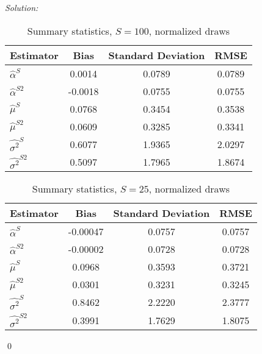 \documentclass[12pt]{article}
\newenvironment{sol}
    {\emph{Solution:}
    }
    {
    \qed
    }
\begin{document}
\begin{sol}
          \begin{table}[htbp]
            \centering
            \caption{Summary statistics, $S = 100$, normalized draws}
              \begin{tabular}{lccc}
                  \toprule
                    Estimator                & Bias             & Standard Deviation         & RMSE           \\
                  \midrule
                    $\hat{\alpha}^S $  &  0.0014&  0.0789   &    0.0789\\
                    $\hat{\alpha}^{S2}$   &-0.0018 &  0.0755&    0.0755   \\
                    $\hat{\mu}^S $     &  0.0768  & 0.3454 &    0.3538  \\
                    $\hat{\mu}^{S2}$   & 0.0609 & 0.3285 &      0.3341  \\
                    $\hat{\sigma^2}^S $     &  0.6077  & 1.9365 &   2.0297  \\
                    $\hat{\sigma^2}^{S2}$   & 0.5097 &  1.7965 &    1.8674     \\
                  \bottomrule
              \end{tabular}
            \label{tab:cf10}
          \end{table}
   
          \begin{table}[htbp]
            \centering
            \caption{Summary statistics, $S = 25$, normalized draws}
              \begin{tabular}{lccc}
                  \toprule
                    Estimator                & Bias             & Standard Deviation         & RMSE           \\
                  \midrule
                  $\hat{\alpha}^S $  &  -0.00047  & 0.0757 & 0.0757 \\
                  $\hat{\alpha}^{S2}$   & -0.00002&  0.0728 &  0.0728  \\
                  $\hat{\mu}^S $     &  0.0968& 0.3593  &  0.3721 \\
                  $\hat{\mu}^{S2}$   & 0.0301 & 0.3231 &   0.3245  \\
                  $\hat{\sigma^2}^S $     &  0.8462  & 2.2220&   2.3777  \\
                  $\hat{\sigma^2}^{S2}$   & 0.3991 & 1.7629   & 1.8075  \\
                  \bottomrule
              \end{tabular}
            \label{tab:cf10}
          \end{table}
\end{sol}
\end{document}
